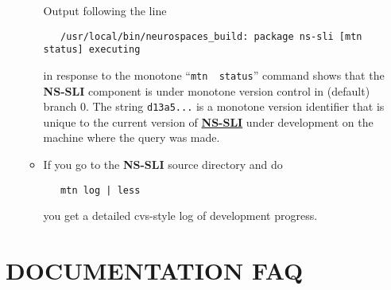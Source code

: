 \documentclass[12pt]{article}
\begin{document}
\begin{enumerate}
\begin{itemize}
Output following the line
\begin{verbatim}
   /usr/local/bin/neurospaces_build: package ns-sli [mtn status] executing
\end{verbatim}
in response to the monotone ``{\tt mtn\,\,status}'' command shows that the {\bf NS-SLI} component is under monotone version control in (default) branch 0. The string {\tt d13a5...} is a monotone version identifier that is
unique to the current version of \href{../ns-sli/ns-sli.tex}{\bf NS-SLI}
under development on the machine where the query was made.

\item If you go to the {\bf NS-SLI} source directory and do
\begin{verbatim}
   mtn log | less
\end{verbatim}
you get a detailed cvs-style log of development progress.

\end{itemize}
\end{enumerate}

\section*{DOCUMENTATION FAQ}
\end{document}
